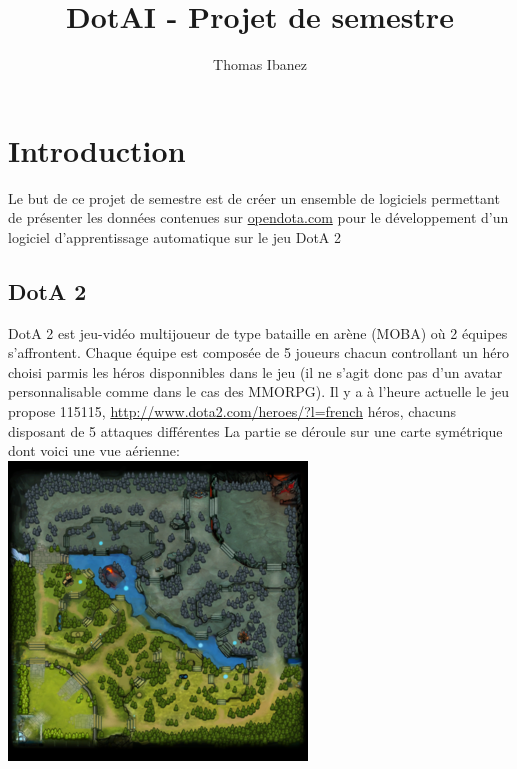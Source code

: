 \documentclass{article}
\title{DotAI - Projet de semestre}
\author{Thomas Ibanez}
\begin{document}
\maketitle

\section{Introduction}

Le but de ce projet de semestre est de créer un ensemble de logiciels permettant de présenter les données contenues sur \url{opendota.com} pour le développement d'un logiciel d'apprentissage automatique sur le jeu DotA 2

\subsection{DotA 2}

DotA 2 est jeu-vidéo multijoueur de type bataille en arène (MOBA) où 2 équipes s'affrontent. Chaque équipe est composée de 5 joueurs chacun controllant un héro choisi parmis les héros disponnibles dans le jeu (il ne s'agit donc pas d'un avatar personnalisable comme dans le cas des MMORPG). Il y a à l'heure actuelle le jeu propose 115115, \url{http://www.dota2.com/heroes/?l=french} héros, chacuns disposant de 5 attaques différentes La partie se déroule sur une carte symétrique dont voici une vue aérienne: \\
\includegraphics[scale=1]{"minimap.png"}
\end{document}
